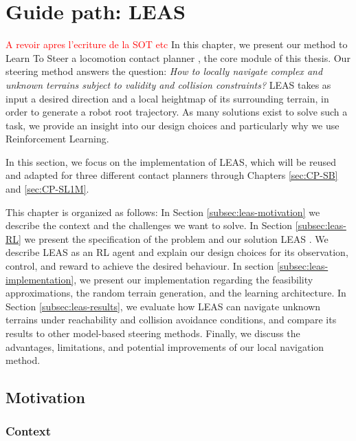 


\chapter{Guide path: LEAS}
\label{sec:LEAS}
\minitoc
\bigskip

\textcolor{red}{A revoir apres l'ecriture de la SOT etc}
In this chapter, we present our method to Learn To Steer a locomotion contact planner , the core module of this thesis. 
Our steering method answers the question: \textit{How to locally navigate complex and unknown terrains subject to validity and collision constraints?}
LEAS takes as input a desired direction and a local heightmap of its surrounding terrain, in order to generate a robot root trajectory.
As many solutions exist to solve such a task, we provide an insight into our design choices and particularly why we use Reinforcement Learning.

In this section, we focus on the implementation of LEAS, which will be reused and adapted for three different contact planners through Chapters \ref{sec:CP-SB} and \ref{sec:CP-SL1M}.

This chapter is organized as follows: 
In Section \ref{subsec:leas-motivation} we describe the context and the challenges we want to solve. In Section \ref{subsec:leas-RL} we present the specification of the problem and our solution LEAS \cite{LEAS}. We describe LEAS as an RL agent and explain our design choices for its observation, control, and reward to achieve the desired behaviour.
In section \ref{subsec:leas-implementation}, we present our implementation regarding the feasibility approximations, the random terrain generation, and the learning architecture.
In Section \ref{subsec:leas-results}, we evaluate how LEAS can navigate unknown terrains under reachability and collision avoidance conditions, and compare its results to other model-based steering methods.
Finally, we discuss the advantages, limitations, and potential improvements of our local navigation method.

\section{Motivation\label{subsec:leas-motivation}}
\subsection{Context\label{subsubsec:context}}

